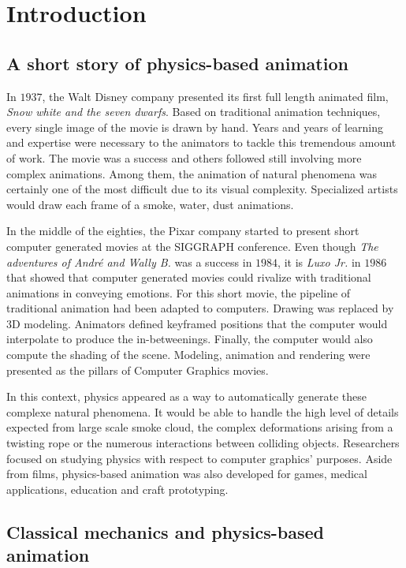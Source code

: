 \chapter{Introduction}
\label{chap:introdution}

\section{A short story of physics-based animation}

In $1937$, the Walt Disney company presented its first full length animated film, \emph{Snow white and the seven dwarfs}. Based on traditional animation techniques, every single image of the movie is drawn by hand. Years and years of learning and expertise were necessary to the animators to tackle this tremendous amount of work. The movie was a success and others followed still involving more complex animations. Among them, the animation of natural phenomena was certainly one of the most difficult due to its visual complexity. Specialized artists would draw each frame of a smoke, water, dust animations.

In the middle of the eighties, the Pixar company started to present short computer generated movies at the SIGGRAPH conference. Even though \emph{The adventures of André and Wally B.} was a success in $1984$, it is \emph{Luxo Jr.} in $1986$ that showed that computer generated movies could rivalize with traditional animations in conveying emotions. For this short movie, the pipeline of traditional animation had been adapted to computers. Drawing was replaced by 3D modeling. Animators defined keyframed positions that the computer would interpolate to produce the in-betweenings. Finally, the computer would also compute the shading of the scene. Modeling, animation and rendering were presented as the pillars of Computer Graphics movies.

In this context, physics appeared as a way to automatically generate these complexe natural phenomena. It would be able to handle the high level of details expected from large scale smoke cloud, the complex deformations arising from a twisting rope or the numerous interactions between colliding objects. Researchers focused on studying physics with respect to computer graphics' purposes. Aside from films, physics-based animation was also developed for games, medical applications, education and craft prototyping.

\section{Classical mechanics and physics-based animation}

